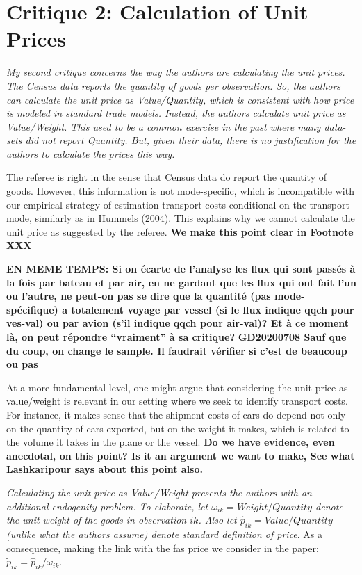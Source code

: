 \documentclass[a4paper,12pt]{article}
\begin{document}
\section{Critique 2: Calculation of Unit Prices}

\textit{My second critique concerns the way the authors are calculating the unit prices.
The Census data reports the quantity of goods per observation. So, the authors
can calculate the unit price as Value/Quantity, which is consistent with how
price is modeled in standard trade models. Instead, the authors calculate unit
price as Value/Weight. This used to be a common exercise in the past where
many data-sets did not report Quantity. But, given their data, there is no
justification for the authors to calculate the prices this way.}

The referee is right in the sense that Census data do report the quantity of goods. However, this information is not mode-specific, which is incompatible with our empirical strategy of estimation transport costs conditional on the transport mode, similarly as in Hummels (2004). This explains why we cannot calculate the unit price as suggested by the referee. \textbf{We make this point clear in Footnote XXX}

\textbf{EN MEME TEMPS: Si on écarte de l'analyse les flux qui sont passés à la fois par bateau et par air, en ne gardant que les flux qui ont fait l'un ou l'autre, ne peut-on pas se dire que la quantité (pas mode-spécifique) a totalement voyage par vessel (si le flux indique qqch pour ves-val) ou par avion (s'il indique qqch pour air-val)? Et à ce moment là, on peut répondre ``vraiment'' à sa critique?} \textbf{GD20200708 Sauf que du coup, on change le sample. Il faudrait vérifier si c’est de beaucoup ou pas}

At a more fundamental level, one might argue that considering the unit price as value/weight is relevant in our setting where we seek to identify transport costs. For instance, it makes sense that the shipment costs of cars do depend not only on the quantity of cars exported, but on the weight it makes, which is related to the volume it takes in the plane or the vessel. \textbf{Do we have evidence, even anecdotal, on this point? Is it an argument we want to make, See what Lashkaripour says about this point also.}

\textit{Calculating the unit price as Value/Weight presents the authors
with an additional endogenity problem. To elaborate, let $\omega_{ik} = Weight/Quantity$
denote the unit weight of the goods in observation $ik$. Also let $\widehat{p}_{ik} = Value/Quantity$
(unlike what the authors assume) denote standard definition of price}. As a consequence, making the link with the fas price we consider in the paper: $\widetilde{p}_{ik} = \widehat{p}_{ik} / \omega_{ik}$.
\end{document}
